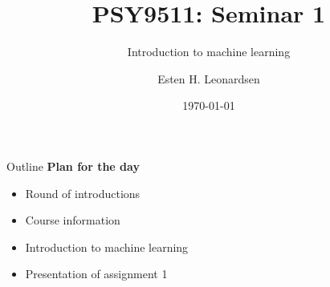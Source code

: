\documentclass[10pt]{beamer}
\title{PSY9511: Seminar 1}
\subtitle{Introduction to machine learning}
\author{Esten H. Leonardsen}
\date{\today}
\begin{document}
	\begin{frame}
	 	\maketitle
	\end{frame}

    \begin{frame}{Outline}
        \textbf{Plan for the day}
        \begin{itemize}
            \item Round of introductions
            \item Course information
            \item Introduction to machine learning
            \item Presentation of assignment 1
        \end{itemize}
    \end{frame}

    
    
\end{document}
